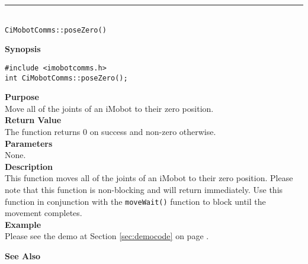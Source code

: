 \noindent
\vspace{5pt}
\rule{4.5in}{0.015in}\\
\noindent
{\LARGE \texttt{CiMobotComms::poseZero()}}\\
{}

\noindent
{\bf Synopsis}\\
\begin{verbatim}
#include <imobotcomms.h>
int CiMobotComms::poseZero();
\end{verbatim}

\noindent
{\bf Purpose}\\
Move all of the joints of an iMobot to their zero position.\\

\noindent
{\bf Return Value}\\
The function returns 0 on success and non-zero otherwise.\\

\noindent
{\bf Parameters}\\
None.\\

\noindent
{\bf Description}\\
This function moves all of the joints of an iMobot to their zero position.
Please note that this function is non-blocking and will return immediately. Use
this function in conjunction with the \texttt{moveWait()} function to block
until the movement completes.\\

\noindent
{\bf Example}\\
Please see the demo at Section \ref{sec:democode} on page \pageref{sec:democode}.\\
\noindent

\noindent
{\bf See Also}\\

